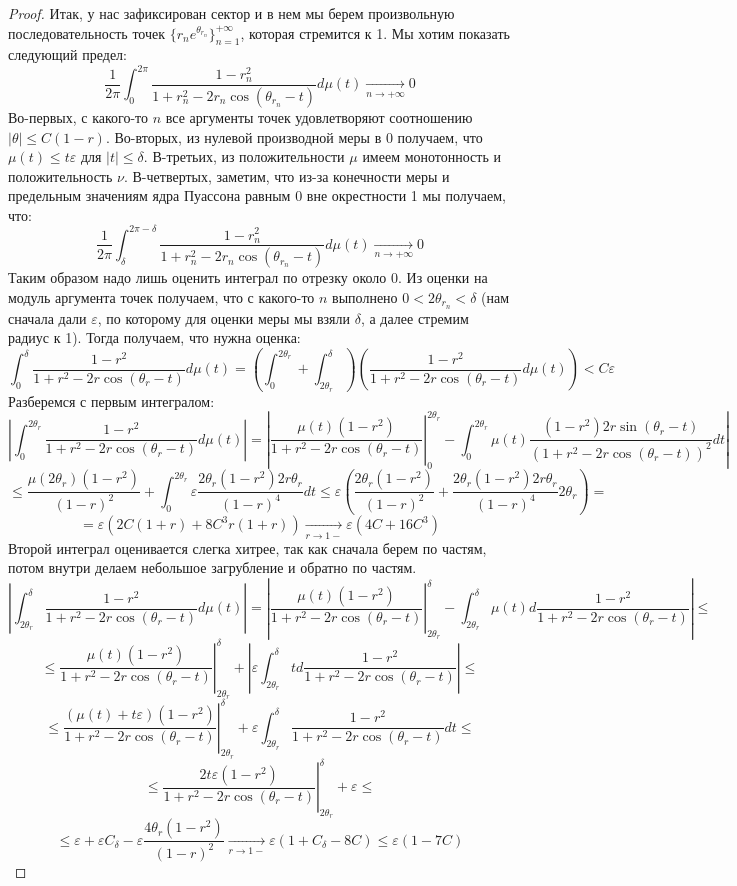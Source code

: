 \documentclass[12pt,a4paper]{article} %
\begin{document}
\begin{proof}
		Итак, у нас зафиксирован сектор и в нем мы берем произвольную последовательность точек $\{r_ne^{\theta_{r_n}}\}_{n=1}^{+\infty}$, которая стремится к 1. Мы хотим показать следующий предел:
		$$\frac{1}{2\pi}\int_0^{2\pi}\frac{1-r_n^2}{1+r_n^2-2r_n\cos(\theta_{r_n}-t)}d\mu(t)\xrightarrow[n\rightarrow+\infty]{} 0$$
		Во-первых, с какого-то $n$ все аргументы точек удовлетворяют соотношению\\ $|\theta|\leq C(1-r)$. Во-вторых, из нулевой производной меры в 0 получаем, что $\mu(t)\leq t\varepsilon$ для $|t|\leq\delta$. В-третьих, из положительности $\mu$ имеем монотонность и положительность $\nu$. В-четвертых, заметим, что из-за конечности меры и предельным значениям ядра Пуассона равным 0 вне окрестности 1 мы получаем, что:
		$$\frac{1}{2\pi}\int_{\delta}^{2\pi-\delta}\frac{1-r_n^2}{1+r_n^2-2r_n\cos(\theta_{r_n}-t)}d\mu(t)\xrightarrow[n\rightarrow+\infty]{} 0$$
		Таким образом надо лишь оценить интеграл по отрезку около 0. Из оценки на модуль аргумента точек получаем, что с какого-то $n$ выполнено $0<2\theta_{r_n}<\delta$ (нам сначала дали $\varepsilon$, по которому для оценки меры мы взяли $\delta$, а далее стремим радиус к 1). Тогда получаем, что нужна оценка:
		$$\int_0^{\delta}\frac{1-r^2}{1+r^2-2r\cos(\theta_r-t)}d\mu(t)=\left(\int_0^{2\theta_r}+\int_{2\theta_r}^{\delta}\right)\left(\frac{1-r^2}{1+r^2-2r\cos(\theta_r-t)}d\mu(t)\right)<C\varepsilon$$
		Разберемся с первым интегралом:
		$$\left|\int_0^{2\theta_r}\frac{1-r^2}{1+r^2-2r\cos(\theta_r-t)}d\mu(t)\right|=\left|\left.\frac{\mu(t)(1-r^2)}{1+r^2-2r\cos(\theta_r-t)}\right|_0^{2\theta_r}-\int_0^{2\theta_r}\mu(t)\frac{(1-r^2)2r\sin(\theta_r-t)}{(1+r^2-2r\cos(\theta_r-t))^2}dt\right|$$
		$$\leq\frac{\mu(2\theta_r)(1-r^2)}{(1-r)^2}+\int_0^{2\theta_r}\varepsilon\frac{2\theta_r(1-r^2)2r\theta_r}{(1-r)^4}dt\leq\varepsilon\left(\frac{2\theta_r(1-r^2)}{(1-r)^2}+\frac{2\theta_r(1-r^2)2r\theta_r}{(1-r)^4}2\theta_r\right)=$$
		$$=\varepsilon(2C(1+r)+8C^3r(1+r))\xrightarrow[r\rightarrow1-]{}\varepsilon (4C+16C^3)$$
		Второй интеграл оценивается слегка хитрее, так как сначала берем по частям, потом внутри делаем небольшое загрубление и обратно по частям.
		$$\left|\int_{2\theta_r}^{\delta}\frac{1-r^2}{1+r^2-2r\cos(\theta_r-t)}d\mu(t)\right|=\left|\left.\frac{\mu(t)(1-r^2)}{1+r^2-2r\cos(\theta_r-t)}\right|_{2\theta_r}^{\delta}-\int_{2\theta_r}^{\delta}\mu(t)d\frac{1-r^2}{1+r^2-2r\cos(\theta_r-t)}\right|\leq$$
		$$\leq\left.\frac{\mu(t)(1-r^2)}{1+r^2-2r\cos(\theta_r-t)}\right|_{2\theta_r}^{\delta}+\left|\varepsilon\int_{2\theta_r}^{\delta}td\frac{1-r^2}{1+r^2-2r\cos(\theta_r-t)}\right|\leq$$
		$$\leq\left.\frac{(\mu(t)+t\varepsilon)(1-r^2)}{1+r^2-2r\cos(\theta_r-t)}\right|_{2\theta_r}^{\delta}+\varepsilon\int_{2\theta_r}^{\delta}\frac{1-r^2}{1+r^2-2r\cos(\theta_r-t)}dt\leq$$
		$$\leq\left.\frac{2t\varepsilon(1-r^2)}{1+r^2-2r\cos(\theta_r-t)}\right|_{2\theta_r}^{\delta}+\varepsilon\leq$$
		$$\leq\varepsilon+\varepsilon C_{\delta}-\varepsilon\frac{4\theta_r(1-r^2)}{(1-r)^2}\xrightarrow[r\rightarrow1-]{}\varepsilon (1+C_{\delta}-8C)\leq\varepsilon (1-7C)$$
	\end{proof}
\end{document}
